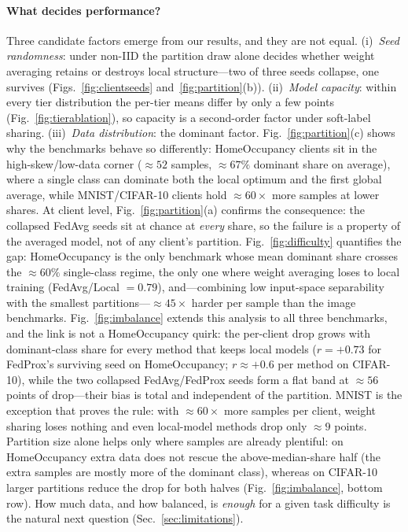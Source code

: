 \documentclass[conference]{IEEEtran}
\begin{document}
\paragraph{What decides performance?}
Three candidate factors emerge from our results, and they are not equal.
(i)~\emph{Seed randomness}: under non-IID the partition draw alone
decides whether weight averaging retains or destroys local
structure---two of three seeds collapse, one survives
(Figs.~\ref{fig:clientseeds} and~\ref{fig:partition}(b)).
(ii)~\emph{Model capacity}: within every
tier distribution the per-tier means differ by only a few points
(Fig.~\ref{fig:tierablation}), so capacity is a second-order factor
under soft-label sharing.  (iii)~\emph{Data distribution}: the dominant
factor.  Fig.~\ref{fig:partition}(c) shows why the benchmarks behave so
differently: HomeOccupancy clients sit in the high-skew/low-data corner
(${\approx}52$ samples, ${\approx}67\%$ dominant share on average),
where a single class can dominate both the local optimum and the first
global average, while MNIST/CIFAR-10 clients hold
${\approx}60{\times}$ more samples at lower shares.  At client level,
Fig.~\ref{fig:partition}(a) confirms the consequence: the collapsed
FedAvg seeds sit at chance at \emph{every} share, so the failure is a
property of the averaged model, not of any client's partition.
Fig.~\ref{fig:difficulty} quantifies the gap: HomeOccupancy is the only
benchmark whose mean dominant share crosses the ${\approx}60\%$
single-class regime, the only one where weight averaging loses to local
training (FedAvg/Local ${=}0.79$), and---combining low input-space
separability with the smallest partitions---${\approx}45{\times}$
harder per sample than the image benchmarks.
Fig.~\ref{fig:imbalance} extends this analysis to all three benchmarks,
and the link is not a HomeOccupancy quirk: the per-client drop grows
with dominant-class share for every method that keeps local models
($r{=}{+}0.73$ for FedProx's surviving seed on HomeOccupancy;
$r{\approx}{+}0.6$ per method on CIFAR-10), while the two collapsed
FedAvg/FedProx seeds form a flat band at ${\approx}56$ points of
drop---their bias is total and independent of the partition.  MNIST is
the exception that proves the rule: with ${\approx}60{\times}$ more
samples per client, weight sharing loses nothing and even local-model
methods drop only ${\approx}9$ points.  Partition size alone helps only
where samples are already plentiful: on HomeOccupancy extra data does
not rescue the above-median-share half (the extra samples are mostly
more of the dominant class), whereas on CIFAR-10 larger partitions
reduce the drop for both halves (Fig.~\ref{fig:imbalance}, bottom row).
How much data, and
how balanced, is \emph{enough} for a given task difficulty is the
natural next question (Sec.~\ref{sec:limitations}).
\end{document}
